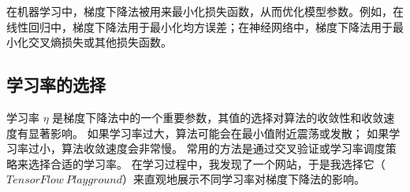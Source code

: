 \documentclass[printMode=false, declarePage=false]{ecnuthesis}
\begin{document}
    在机器学习中，梯度下降法被用来最小化损失函数，从而优化模型参数。例如，在线性回归中，梯度下降法用于最小化均方误差；在神经网络中，梯度下降法用于最小化交叉熵损失或其他损失函数。

    \subsection{学习率的选择}
    学习率 \( \eta \) 是梯度下降法中的一个重要参数，其值的选择对算法的收敛性和收敛速度有显著影响。
    如果学习率过大，算法可能会在最小值附近震荡或发散；
    如果学习率过小，算法收敛速度会非常慢。
    常用的方法是通过交叉验证或学习率调度策略来选择合适的学习率。\cite{yang2020auto}
    在学习过程中，我发现了一个网站，于是我选择它（\href{https://playground.tensorflow.org/}{$TensorFlow\ Playground$}）来直观地展示不同学习率对梯度下降法的影响。
    
\end{document}
